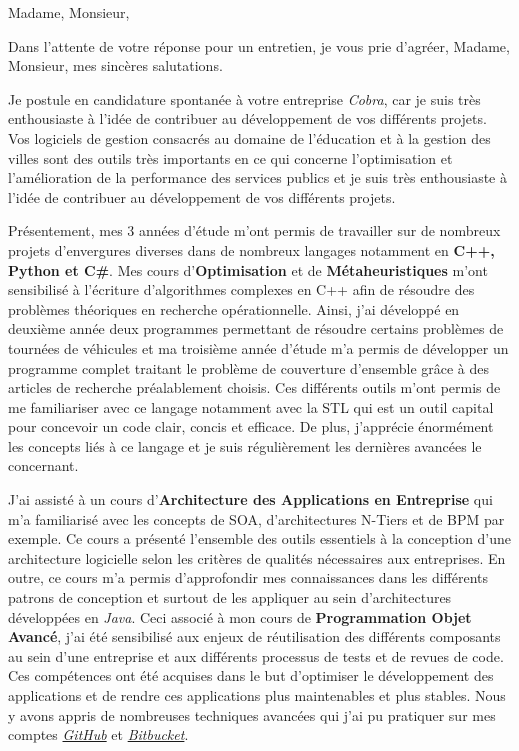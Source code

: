 \date{\today}
\opening{Madame, Monsieur,}
\closing{Dans l'attente de votre réponse pour un entretien, je vous prie d'agréer, Madame, Monsieur, mes sincères salutations.}

\makelettertitle

\introduce{}

Je postule en candidature spontanée à votre entreprise \textit{Cobra}, car je suis très enthousiaste à l'idée de contribuer au développement de vos différents projets. Vos logiciels de gestion consacrés au domaine de l'éducation et à la gestion des villes sont des outils très importants en ce qui concerne l'optimisation et l'amélioration de la performance des services publics et je suis très enthousiaste à l'idée de contribuer au développement de vos différents projets.

Présentement, mes 3 années d'étude m'ont permis de travailler sur de nombreux projets d'envergures diverses dans de nombreux langages notamment en \textbf{C++, Python et C\#}. Mes cours d'\textbf{Optimisation} et de \textbf{Métaheuristiques} m'ont sensibilisé à l'écriture d'algorithmes complexes en C++ afin de résoudre des problèmes théoriques en recherche opérationnelle. Ainsi, j'ai développé en deuxième année deux programmes permettant de résoudre certains problèmes de tournées de véhicules et ma troisième année d'étude m'a permis de développer un programme complet traitant le problème de couverture d'ensemble grâce à des articles de recherche préalablement choisis. Ces différents outils m'ont permis de me familiariser avec ce langage notamment avec la STL qui est un outil capital pour concevoir un code clair, concis et efficace. De plus, j'apprécie énormément les concepts liés à ce langage et je suis régulièrement les dernières avancées le concernant.

J'ai assisté à un cours d'\textbf{Architecture des Applications en Entreprise} qui m'a familiarisé avec les concepts de SOA, d'architectures N-Tiers et de BPM par exemple. Ce cours a présenté l'ensemble des outils essentiels à la conception d'une architecture logicielle selon les critères de qualités nécessaires aux entreprises. En outre, ce cours m'a permis d'approfondir mes connaissances dans les différents patrons de conception et surtout de les appliquer au sein d'architectures développées en \textit{Java}. Ceci associé à mon cours de \textbf{Programmation Objet Avancé}, j'ai été sensibilisé aux enjeux de réutilisation des différents composants au sein d'une entreprise et aux différents processus de tests et de revues de code. Ces compétences ont été acquises dans le but d'optimiser le développement des applications et de rendre ces applications plus maintenables et plus stables. Nous y avons appris de nombreuses techniques avancées qui j'ai pu pratiquer sur mes comptes \href{https://github.com/vlnk/ShootYourFridge}{\textit{GitHub}} et \href{https://bitbucket.org/vlnk/tronpoa}{\textit{Bitbucket}}.


